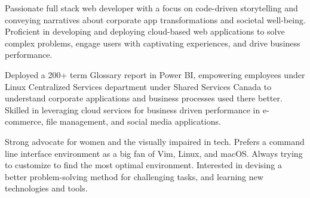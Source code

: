 

\begin{cvparagraph}

    Passionate full stack web developer with a focus on code-driven storytelling and conveying narratives about corporate app transformations and societal well-being. Proficient in developing and deploying cloud-based web applications to solve complex problems, engage users with captivating experiences, and drive business performance.

    Deployed a 200+ term Glossary report in Power BI, empowering employees under Linux Centralized Services department under Shared Services Canada to understand corporate applications and business processes used there better. Skilled in leveraging cloud services for business driven performance in e-commerce, file management, and social media applications.

    Strong advocate for women and the visually impaired in tech. Prefers a command line interface environment as a big fan of Vim, Linux, and macOS. Always trying to customize to find the most optimal environment. Interested in devising a better problem-solving method for challenging tasks, and learning new technologies and tools.
\end{cvparagraph}
